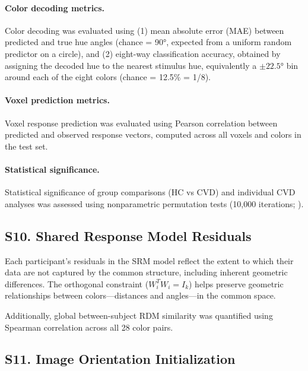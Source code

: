 \paragraph{Color decoding metrics.}

Color decoding was evaluated using (1) mean absolute error (MAE) between predicted and true hue angles (chance = 90°, expected from a uniform random predictor on a circle), and (2) eight-way classification accuracy, obtained by assigning the decoded hue to the nearest stimulus hue, equivalently a $\pm 22.5$° bin around each of the eight colors (chance = 12.5\% = 1/8).

\paragraph{Voxel prediction metrics.}

Voxel response prediction was evaluated using Pearson correlation between predicted and observed response vectors, computed across all voxels and colors in the test set.

\paragraph{Statistical significance.}

Statistical significance of group comparisons (HC vs CVD) and individual CVD analyses was assessed using nonparametric permutation tests (10,000 iterations; ).



\subsection*{\textbf{S10. Shared Response Model Residuals}}

Each participant's residuals in the SRM model reflect the extent to which their data are not captured by the common structure, including inherent geometric differences.
The orthogonal constraint ($W_i^T W_i = I_k$) helps preserve geometric relationships between colors---distances and angles---in the common space.

Additionally, global between-subject RDM similarity was quantified using Spearman correlation across all 28 color pairs.



\subsection*{\textbf{S11. Image Orientation Initialization}}


